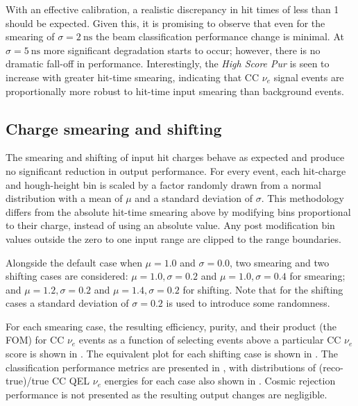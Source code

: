 With an effective calibration, a realistic discrepancy in hit times of less than
\unit{1}{} should be expected. Given this, it is promising to observe that even for the
smearing of $\sigma=2~\text{ns}$ the beam classification performance change is minimal. At
$\sigma=5~\text{ns}$ more significant degradation starts to occur; however, there is no dramatic
fall-off in performance. Interestingly, the \emph{High Score Pur} is seen to increase with greater
hit-time smearing, indicating that CC $\nu_{e}$ signal events are proportionally more robust to
hit-time input smearing than background events.

\subsection{Charge smearing and shifting} %
\label{sec:results_robust_charge} %

The smearing and shifting of input hit charges behave as expected and produce no significant
reduction in output performance. For every event, each hit-charge and hough-height bin is scaled
by a factor randomly drawn from a normal distribution with a mean of $\mu$ and a standard
deviation of $\sigma$. This methodology differs from the absolute hit-time smearing above by
modifying bins proportional to their charge, instead of using an absolute value. Any post
modification bin values outside the zero to one input range are clipped to the range boundaries.

Alongside the default case when $\mu=1.0$ and $\sigma=0.0$, two smearing and two shifting cases
are considered: $\mu=1.0,\sigma=0.2$ and $\mu=1.0,\sigma=0.4$ for smearing; and
$\mu=1.2,\sigma=0.2$ and $\mu=1.4,\sigma=0.2$ for shifting. Note that for the shifting cases a
standard deviation of $\sigma=0.2$ is used to introduce some randomness.

For each smearing case, the resulting efficiency, purity, and their product (the FOM) for CC
$\nu_{e}$ events as a function of selecting events above a particular CC $\nu_{e}$ score is shown
in . The equivalent plot for each shifting case
is shown in . The classification performance
metrics are presented in , with distributions of (reco-true)/true CC
QEL $\nu_{e}$ energies for each case also shown in . Cosmic
rejection performance is not presented as the resulting output changes are negligible.

